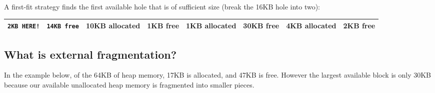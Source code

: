 A first-fit strategy finds the first available hole that is of
sufficient size (break the 16KB hole into two):

\begin{longtable}[c]{@{}llllllll@{}}
\toprule
\begin{minipage}[b]{0.04\columnwidth}\raggedright\strut
\texttt{2KB\ HERE!}
\strut\end{minipage} &
\begin{minipage}[b]{0.04\columnwidth}\raggedright\strut
\texttt{14KB\ free}
\strut\end{minipage} &
\begin{minipage}[b]{0.04\columnwidth}\raggedright\strut
10KB allocated
\strut\end{minipage} &
\begin{minipage}[b]{0.04\columnwidth}\raggedright\strut
1KB free
\strut\end{minipage} &
\begin{minipage}[b]{0.04\columnwidth}\raggedright\strut
1KB allocated
\strut\end{minipage} &
\begin{minipage}[b]{0.04\columnwidth}\raggedright\strut
30KB free
\strut\end{minipage} &
\begin{minipage}[b]{0.04\columnwidth}\raggedright\strut
4KB allocated
\strut\end{minipage} &
\begin{minipage}[b]{0.04\columnwidth}\raggedright\strut
2KB free
\strut\end{minipage}\tabularnewline
\midrule
\endhead
\bottomrule
\end{longtable}

\subsection{What is external
fragmentation?}\label{what-is-external-fragmentation}

In the example below, of the 64KB of heap memory, 17KB is allocated, and
47KB is free. However the largest available block is only 30KB because
our available unallocated heap memory is fragmented into smaller pieces.

